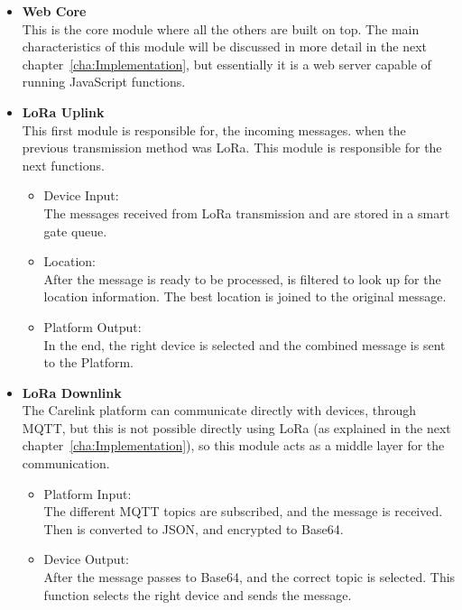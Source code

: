 \begin{itemize}
\item \textbf{Web Core} \\
This is the core module where all the others are built on top. The main characteristics of this module will be discussed in more detail in the next chapter~\ref{cha:Implementation}, but essentially it is a web server capable of running JavaScript functions.
\end{itemize}

\begin{itemize}
\label{susec:Lora_to_Platform}
   \item \textbf{LoRa Uplink} \\
   This first module is responsible for, the incoming messages. when the previous transmission method was LoRa. This module is responsible for the  next functions.
   \begin{itemize}
     \item Device Input: \\
      The messages received from LoRa transmission and are stored in a smart gate  queue.
   \end{itemize}
   \begin{itemize}
     \item Location: \\
      After the message is ready to be processed, is filtered to look up for the location information. The best location is joined to the original message.
   \end{itemize}
   \begin{itemize}
     \item Platform Output: \\
      In the end, the right device is selected and  the combined message is sent to the Platform.
   \end{itemize}
\end{itemize}


\begin{itemize}
   \item \textbf{LoRa Downlink} \\
   The Carelink platform can communicate directly with devices, through MQTT, but this is not possible directly using LoRa (as explained in the next chapter~\ref{cha:Implementation}), so this module acts as a middle layer for the communication. 
   \begin{itemize}
     \item Platform Input:\\ 
     The different MQTT topics are subscribed, and the message is received. Then is converted to JSON, and encrypted to Base64.
   \end{itemize}
   \begin{itemize}
     \item Device Output: \\
     After the message passes to Base64, and the correct topic is selected. This function selects the right device and sends the message.
   \end{itemize}
\end{itemize}


